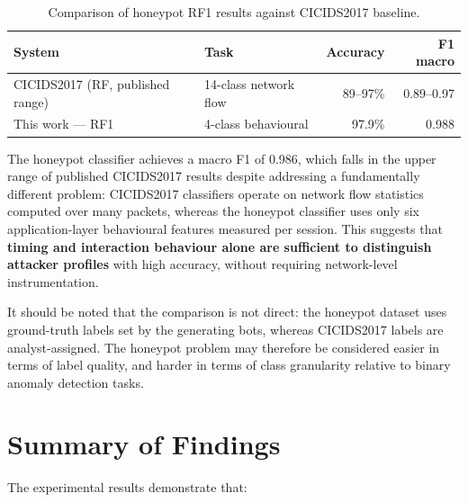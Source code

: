 \begin{table}[h]
\centering
\caption{Comparison of honeypot RF1 results against CICIDS2017 baseline.}
\label{tab:baseline}
\begin{tabular}{llrr}
\hline
\textbf{System} & \textbf{Task} & \textbf{Accuracy} & \textbf{F1 macro} \\
\hline
CICIDS2017 (RF, published range) & 14-class network flow & 89–97\% & 0.89–0.97 \\
This work — RF1                  & 4-class behavioural   & 97.9\%  & 0.988     \\
\hline
\end{tabular}
\end{table}

The honeypot classifier achieves a macro F1 of 0.986, which falls in
the upper range of published CICIDS2017 results despite addressing a
fundamentally different problem: CICIDS2017 classifiers operate on
network flow statistics computed over many packets, whereas the honeypot
classifier uses only six application-layer behavioural features measured
per session. This suggests that \textbf{timing and interaction behaviour
alone are sufficient to distinguish attacker profiles} with high
accuracy, without requiring network-level instrumentation.

It should be noted that the comparison is not direct: the honeypot
dataset uses ground-truth labels set by the generating bots, whereas
CICIDS2017 labels are analyst-assigned. The honeypot problem may
therefore be considered easier in terms of label quality, and harder in
terms of class granularity relative to binary anomaly detection tasks.

\section{Summary of Findings}

The experimental results demonstrate that:

